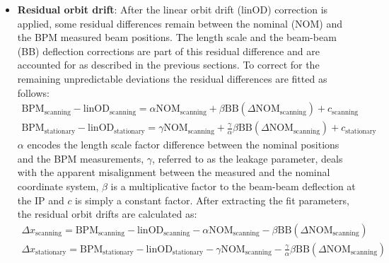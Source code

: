 \begin{itemize}
	\item \textbf{Residual orbit drift}: After the linear orbit drift (linOD) correction is applied, some residual differences remain between the nominal (NOM) and the BPM measured beam positions. The length scale and the beam-beam (BB) deflection corrections are part of this residual difference and are accounted for as described in the previous sections. To correct for the remaining unpredictable deviations the residual differences are fitted as follows:
    \begin{gather}
    \mathrm{BPM}_{\mathrm{scanning}} - \mathrm{linOD}_{\mathrm{scanning}} = \alpha \mathrm{NOM}_{\mathrm{scanning}} + \beta \mathrm{BB}(\Delta\mathrm{NOM_{\mathrm{scanning}}}) + c_{\mathrm{scanning}} \\
    \mathrm{BPM}_{\mathrm{stationary}} - \mathrm{linOD}_{\mathrm{stationary}} = \gamma \mathrm{NOM}_{\mathrm{scanning}} + \frac{\gamma}{\alpha} \beta \mathrm{BB}(\Delta\mathrm{NOM}_{\mathrm{scanning}}) + c_{\mathrm{stationary}}
    \end{gather}
    $\alpha$ encodes the length scale factor difference between the nominal positions and the BPM measurements, $\gamma$, referred to as the leakage parameter, deals with the apparent misalignment between the measured and the nominal coordinate system, $\beta$ is a multiplicative factor to the beam-beam deflection at the IP and $c$ is simply a constant factor. After extracting the fit parameters, the residual orbit drifts are calculated as:
    \begin{gather}
    \Delta x_{\mathrm{scanning}} = \mathrm{BPM}_{\mathrm{scanning}} - \mathrm{linOD}_{\mathrm{scanning}} - \alpha \mathrm{NOM}_{\mathrm{scanning}} - \beta \mathrm{BB}(\Delta\mathrm{NOM_{\mathrm{scanning}}}) \\
    \Delta x_{\mathrm{stationary}} = \mathrm{BPM}_{\mathrm{stationary}} - \mathrm{linOD}_{\mathrm{stationary}} - \gamma \mathrm{NOM}_{\mathrm{scanning}} - \frac{\gamma}{\alpha} \beta \mathrm{BB}(\Delta\mathrm{NOM}_{\mathrm{scanning}})
    \end{gather}


\end{itemize}
